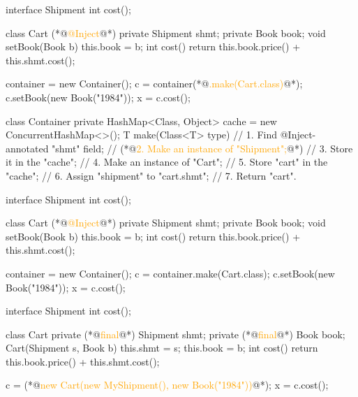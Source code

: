 \documentclass{article}
\begin{document}
\begin{lnSnippet}
interface Shipment
  int cost();

class Cart
  (*@\textcolor{orange}{@Inject}@*) private Shipment shmt;
  private Book book;
  void setBook(Book b)
    this.book = b;
  int cost()
    return this.book.price() + this.shmt.cost();

container = new Container();
c = container(*@\textcolor{orange}{.make(Cart.class)}@*);
c.setBook(new Book("1984"));
x = c.cost();
\end{lnSnippet}
\begin{lnSnippet}
class Container {
  private HashMap<Class, Object> cache =
    new ConcurrentHashMap<>();
  T make(Class<T> type) {
    // 1. Find @Inject-annotated "shmt" field;
    // (*@\textcolor{orange}{2. Make an instance of "Shipment";}@*)
    // 3. Store it in the "cache";
    // 4. Make an instance of "Cart";
    // 5. Store "cart" in the "cache";
    // 6. Assign "shipment" to "cart.shmt";
    // 7. Return "cart".
  }
}
\end{lnSnippet}

\begin{lnSnippet}
interface Shipment
  int cost();

class Cart
  (*@\textcolor{orange}{@Inject}@*) private Shipment shmt;
  private Book book;
  void setBook(Book b)
    this.book = b;
  int cost()
    return this.book.price() + this.shmt.cost();

container = new Container();
c = container.make(Cart.class);
c.setBook(new Book("1984"));
x = c.cost();
\end{lnSnippet}
\begin{lnSnippet}
interface Shipment
  int cost();

class Cart
  private (*@\textcolor{orange}{final}@*) Shipment shmt;
  private (*@\textcolor{orange}{final}@*) Book book;
  Cart(Shipment s, Book b)
    this.shmt = s;
    this.book = b;
  int cost()
    return this.book.price() + this.shmt.cost();

c = (*@\textcolor{orange}{new Cart(new MyShipment(), new Book("1984"))}@*);
x = c.cost();
\end{lnSnippet}
\end{document}
